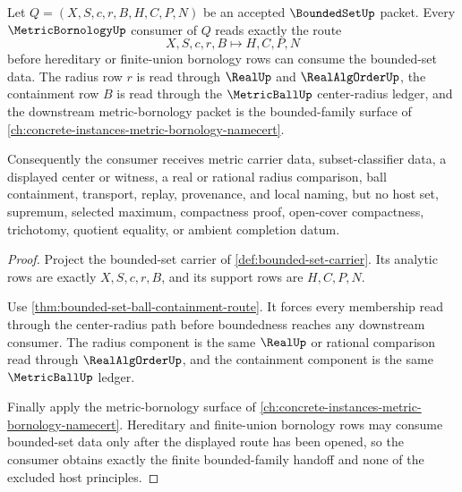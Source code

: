 \begin{theorem}
\label{thm:bounded-set-metric-bornology-consumer}
Let $Q=(X,S,c,r,B,H,C,P,N)$ be an accepted $\BoundedSetUp$ packet. Every $\MetricBornologyUp$ consumer of $Q$ reads exactly the route
$$
X,S,c,r,B \longmapsto H,C,P,N
$$
before hereditary or finite-union bornology rows can consume the bounded-set data. The radius row $r$ is read through $\RealUp$ and $\RealAlgOrderUp$, the containment row $B$ is read through the $\MetricBallUp$ center-radius ledger, and the downstream metric-bornology packet is the bounded-family surface of \autoref{ch:concrete-instances-metric-bornology-namecert}.

Consequently the consumer receives metric carrier data, subset-classifier data, a displayed center or witness, a real or rational radius comparison, ball containment, transport, replay, provenance, and local naming, but no host set, supremum, selected maximum, compactness proof, open-cover compactness, trichotomy, quotient equality, or ambient completion datum.
\end{theorem}
\begin{proof}
Project the bounded-set carrier of \autoref{def:bounded-set-carrier}. Its analytic rows are exactly $X,S,c,r,B$, and its support rows are $H,C,P,N$.

Use \autoref{thm:bounded-set-ball-containment-route}. It forces every membership read through the center-radius path before boundedness reaches any downstream consumer. The radius component is the same $\RealUp$ or rational comparison read through $\RealAlgOrderUp$, and the containment component is the same $\MetricBallUp$ ledger.

Finally apply the metric-bornology surface of \autoref{ch:concrete-instances-metric-bornology-namecert}. Hereditary and finite-union bornology rows may consume bounded-set data only after the displayed route has been opened, so the consumer obtains exactly the finite bounded-family handoff and none of the excluded host principles.
\end{proof}

